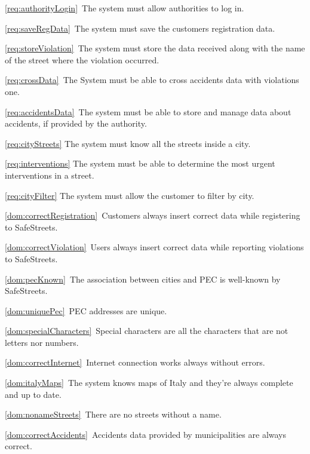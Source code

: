 \begin{description}
\begin{description}
					\item \ref{req:authorityLogin}\ The system must allow authorities to log in.
					\item \ref{req:saveRegData}\ The system must save the customers registration data.
					\item \ref{req:storeViolation}\ The system must store the data received along with the name of the street where the violation occurred.
					\item \ref{req:crossData}\ The System must be able to cross accidents data with violations one.
					\item \ref{req:accidentsData}\ The system must be able to store and manage data about accidents, if provided by the authority.
					\item \ref{req:cityStreets} The system must know all the streets inside a city.
					\item \ref{req:interventions} The system must be able to determine the most urgent interventions in a street.
					\item \ref{req:cityFilter} The system must allow the customer to filter by city.
					\item \ref{dom:correctRegistration}\ Customers always insert correct data while registering to SafeStreets.
					\item \ref{dom:correctViolation}\ Users always insert correct data while reporting violations to SafeStreets.
					\item \ref{dom:pecKnown}\ The association between cities and PEC is well-known by SafeStreets.
					\item \ref{dom:uniquePec}\ PEC addresses are unique.
					\item \ref{dom:specialCharacters}\ Special characters are all the characters that are not letters nor numbers.
					\item \ref{dom:correctInternet}\ Internet connection works always without errors.
					\item \ref{dom:italyMaps}\ The system knows maps of Italy and they’re always complete and up to date.
					\item \ref{dom:nonameStreets}\ There are no streets without a name.
					\item \ref{dom:correctAccidents}\ Accidents data provided by municipalities are always correct.	
				\end{description}		
		\end{description}

